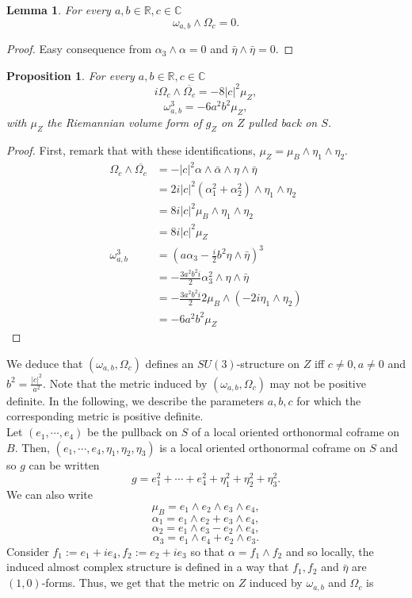 \documentclass[12pt, reqno]{amsart}
\newtheorem{prop}[Def]{Proposition}
\newtheorem{lemma}[Def]{Lemma}
\theoremstyle{definition}
\newcommand{\R}{\mathbb{R}}
\newcommand{\C}{\mathbb{C}}
\begin{document}
\begin{lemma}
    For every $a,b\in\R, c\in\C$ $$\omega_{a,b}\wedge\Omega_c=0.$$
\end{lemma}
\begin{proof}
    Easy consequence from $\alpha_3\wedge\alpha=0$ and $\bar\eta\wedge\bar\eta=0$.
\end{proof}
\begin{prop}
    For every $a,b\in\R, c\in\C$ $$i\Omega_c\wedge\overline{\Omega_c}=-8|c|^2\mu_Z,$$ $$\omega_{a,b}^3=-6a^2b^2\mu_Z,$$ with $\mu_Z$ the Riemannian volume form of $g_Z$ on $Z$ pulled back on $S$. 
\end{prop}
\begin{proof}
First, remark that with these identifications, $\mu_Z=\mu_B\wedge\eta_1\wedge\eta_2$. 
    \begin{align*}
        \Omega_c\wedge\overline{\Omega_c}&=-|c|^2\alpha\wedge\bar\alpha\wedge\eta\wedge\bar\eta\\
        &=2i|c|^2(\alpha_1^2+\alpha_2^2)\wedge\eta_1\wedge\eta_2\\
        &=8i|c|^2\mu_B\wedge\eta_1\wedge\eta_2\\
        &=8i|c|^2\mu_Z\\
        \omega_{a,b}^3&=(a\alpha_3-\frac{i}{2}b^2\eta\wedge\bar\eta)^3\\
        &=-\frac{3a^2b^2i}{2}\alpha_3^2\wedge\eta\wedge\bar\eta\\
        &=-\frac{3a^2b^2i}{2}2\mu_B\wedge(-2i\eta_1\wedge\eta_2)\\
        &=-6a^2b^2\mu_Z
    \end{align*}
\end{proof}
 We deduce that $(\omega_{a,b},\Omega_c)$ defines an $SU(3)$-structure on $Z$ iff $c\neq 0, a\neq 0$ and $b^2=\frac{|c|^2}{a^2}$. Note that the metric induced by $(\omega_{a,b},\Omega_c)$ may not be positive definite. In the following, we describe the parameters $a,b,c$ for which the corresponding metric is positive definite.\\ \indent Let $(e_1,\cdots,e_4)$ be the pullback on $S$ of a local oriented orthonormal coframe on $B$. Then, $(e_1,\cdots,e_4,\eta_1,\eta_2,\eta_3)$ is a local oriented orthonormal coframe on $S$ and so $g$ can be written $$g=e_1^2+\cdots+e_4^2+\eta_1^2+\eta_2^2+\eta_3^2.$$ We can also write $$\mu_B=e_1\wedge e_2\wedge e_3\wedge e_4,$$ $$\alpha_1=e_1\wedge e_2+e_3\wedge e_4,$$ $$\alpha_2=e_1\wedge e_3-e_2\wedge e_4,$$ $$\alpha_3=e_1\wedge e_4+e_2\wedge e_3.$$ Consider $f_1:=e_1+ie_4, f_2:=e_2+ie_3$ so that $\alpha=f_1\wedge f_2$ and so locally, the induced almost complex structure is defined in a way that $f_1,f_2$ and $\bar\eta$ are $(1,0)$-forms. Thus, we get that the metric on $Z$ induced by $\omega_{a,b}$ and $\Omega_c$ is
\end{document}
